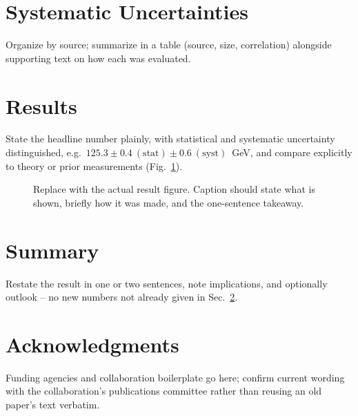 \documentclass[11pt]{article}
\begin{document}
\section{Systematic Uncertainties}
\label{sec:systematics}

Organize by source; summarize in a table (source, size, correlation)
alongside supporting text on how each was evaluated.

\section{Results}
\label{sec:results}

State the headline number plainly, with statistical and systematic
uncertainty distinguished, e.g.\ $125.3 \pm 0.4~\mathrm{(stat)} \pm
0.6~\mathrm{(syst)}$~GeV, and compare explicitly to theory or prior
measurements (Fig.~\ref{fig:result}).

\begin{figure}[htbp]
  \centering
  \caption{Replace with the actual result figure. Caption should state what
    is shown, briefly how it was made, and the one-sentence takeaway.}
  \label{fig:result}
\end{figure}

\section{Summary}
\label{sec:summary}

Restate the result in one or two sentences, note implications, and
optionally outlook -- no new numbers not already given in
Sec.~\ref{sec:results}.

\section*{Acknowledgments}

Funding agencies and collaboration boilerplate go here; confirm current
wording with the collaboration's publications committee rather than reusing
an old paper's text verbatim.


\end{document}
